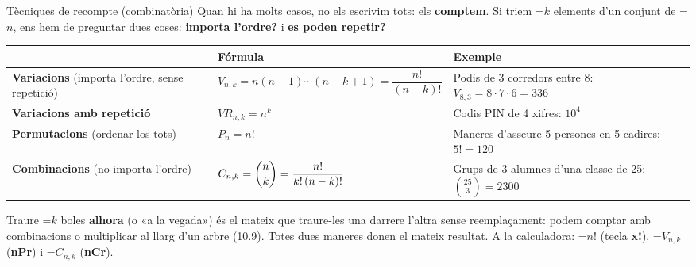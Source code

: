 \documentclass[11pt,a4paper]{article}
\newcommand{\fmm}[1]{\setbox0=\hbox{$#1$}\ifdim\wd0>\linewidth\fmdisp{#1}\else\mbox{\box0}\fi}
\newcommand{\fmdisp}[1]{\[\setbox2=\hbox{$\displaystyle #1$}\ifdim\wd2>\linewidth\resizebox{\linewidth}{!}{\box2}\else\box2\fi\]}
\begin{document}
\begin{fmdef}{Tècniques de recompte (combinatòria)}
Quan hi ha molts casos, no els escrivim tots: els \textbf{comptem}. Si triem \fmm{k} elements d'un conjunt de \fmm{n}, ens hem de preguntar dues coses: \textbf{importa l'ordre?} i \textbf{es poden repetir?}

\begin{center}\renewcommand{\arraystretch}{1.5}\small\begin{tabularx}{\linewidth}{>{\raggedright\arraybackslash}p{3.2cm}>{\raggedright\arraybackslash}X>{\raggedright\arraybackslash}X}\toprule
\textbf{} & \textbf{Fórmula} & \textbf{Exemple}\\\midrule
\textbf{Variacions} (importa l'ordre, sense repetició) & $V_{n,k}=n(n-1)\cdots(n-k+1)=\dfrac{n!}{(n-k)!}$ & Podis de 3 corredors entre 8: $V_{8,3}=8\cdot7\cdot6=336$\\[3pt]
\textbf{Variacions amb repetició} & $VR_{n,k}=n^k$ & Codis PIN de 4 xifres: $10^4$\\[3pt]
\textbf{Permutacions} (ordenar-los tots) & $P_n=n!$ & Maneres d'asseure 5 persones en 5 cadires: $5!=120$\\[3pt]
\textbf{Combinacions} (no importa l'ordre) & $C_{n,k}=\dbinom nk=\dfrac{n!}{k!\,(n-k)!}$ & Grups de 3 alumnes d'una classe de 25: $\binom{25}{3}=2300$\\[3pt]
\bottomrule\end{tabularx}\end{center}

\begin{fmnote}Traure \fmm{k} boles \textbf{alhora} (o «a la vegada») és el mateix que traure-les una darrere l'altra sense reemplaçament: podem comptar amb combinacions o multiplicar al llarg d'un arbre (10.9). Totes dues maneres donen el mateix resultat. A la calculadora: \fmm{n!} (tecla \textbf{x!}), \fmm{V_{n,k}} (\textbf{nPr}) i \fmm{C_{n,k}} (\textbf{nCr}).\end{fmnote}
\end{fmdef}
\end{document}
